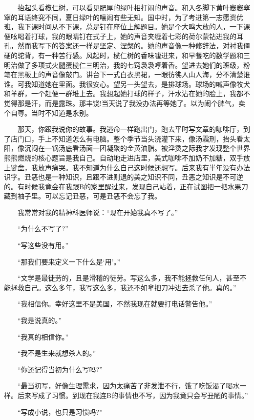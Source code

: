 \documentclass[12pt,UTF8]{ctexbook}
\begin{document}
　　抬起头看榄仁树，可以看见肥厚的绿叶相打闹的声音。和入冬脚下黄叶窸窸窣窣的耳语终究不同，夏日绿叶的嚷闹有些无知。国中时，为了考进第一志愿资优班，我下课时间从不下课，总是钉在座位上解题目。她是个大鸣大放的人，一下课便吆喝着打球，我的眼晴钉在式子上，她的声音夹缠着七彩的荷尔蒙钻进我的耳孔，然而我写下的答案还一样是坚定、涅槃的。她的声音像一种修辞法，对衬我僵硬的驼背，有一种苦行感。风起时，榄仁树的香味嘘进来，和早餐吃的数学题和三明治做了多项式火腿蛋榄仁三明治，我的七窍袅袅哼着香。望进去她们的班级，粉笔在黑板上的声音像敲门。讲台下一式白衣黑裙，一眼彷彿人山人海，分不清楚谁谁。可我知道她在里面。我很安心。望另一头望去，是排球场。球场的喊声像牧犬和羊群，一个赶便一群堆上去。我想起她打球的样子，汗水沾在她的脸上，我都不觉得那是汗，而是露珠。那丰饶!当天说了我没办法再等她了。以为闹个脾气，卖个自尊。当时不知道是永别。

　　那天，你跟我说你的故事。我逃命一样跑出门，跑去平时写文章的咖啡厅，到了店门口，手上不知道怎么有电脑。整个季节当头浇灌下来，像汤霜刑，抬头看太阳，像沉闷在一锅汤底看汤面一团凝聚的金黄油脂。被淫烫之际我才发现整个世界熊熊燃烧的核心题旨是我自己。自动地走进店里，美式咖啡不加奶不加糖，双手放上键盘，我放声痛哭。我不知道为什么自己这时候还想写。后来我有半年没有办法识字。丑恶也是一种知识，且跟不进则退的美之知识不同，丑恶之知识是不可逆的。有时候我竟会在我跟B的家里醒过来，发现自己站着，正在试图把一把水果刀藏到袖子里。可以忘记丑恶，可是丑恶不会忘了我。

　　我常常对我的精神科医师说：\enquote{现在开始我真不写了。}

　　\enquote{为什么不写了?}

　　\enquote{写这些没有用。}

　　\enquote{那我们要来定义一下什么是`用'。}

　　\enquote{文学是最徒劳的，且是滑稽的徒劳。写这么多，我不能拯救任何人，甚至不能拯救自己。这么多年，我写这么多，我还不如拿把刀冲进去杀了他。真的。}

　　\enquote{我相信你。幸好这里不是美国，不然我现在就要打电话警告他。}

　　\enquote{我是说真的。}

　　\enquote{我真的相信你。}

　　\enquote{我不是生来就想杀人的。}

　　\enquote{你还记得当初为什么写吗?}

　　\enquote{最当初写，好像生理需求，因为太痛苦了非发泄不行，饿了吃饭渴了喝水一样。后来写成了习惯。到现在我连B的事情也不写，因为我竟只会写丑陋的事情。}

　　\enquote{写成小说，也只是习惯吗?}
\end{document}

